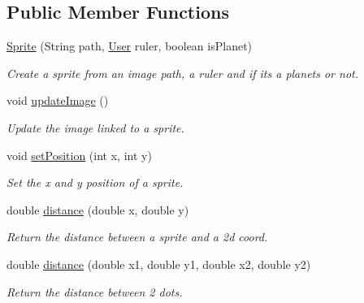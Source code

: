 \subsection*{Public Member Functions}
\begin{DoxyCompactItemize}
\item 
\hyperlink{classfr_1_1groupe40_1_1projet_1_1model_1_1_sprite_acbe678213b404fd8ae1a77fe274fdca8}{Sprite} (String path, \hyperlink{classfr_1_1groupe40_1_1projet_1_1client_1_1_user}{User} ruler, boolean is\+Planet)
\begin{DoxyCompactList}\small\item\em Create a sprite from an image path, a ruler and if its a planets or not. \end{DoxyCompactList}\item 
\mbox{\label{classfr_1_1groupe40_1_1projet_1_1model_1_1_sprite_a762bbcf4f03eecab8de2b05aa19a103a}} 
void \hyperlink{classfr_1_1groupe40_1_1projet_1_1model_1_1_sprite_a762bbcf4f03eecab8de2b05aa19a103a}{update\+Image} ()
\begin{DoxyCompactList}\small\item\em Update the image linked to a sprite. \end{DoxyCompactList}\item 
void \hyperlink{classfr_1_1groupe40_1_1projet_1_1model_1_1_sprite_ab3b2649df13b98ba229c292328e31b25}{set\+Position} (int x, int y)
\begin{DoxyCompactList}\small\item\em Set the x and y position of a sprite. \end{DoxyCompactList}\item 
double \hyperlink{classfr_1_1groupe40_1_1projet_1_1model_1_1_sprite_a4907c1229ac5b6a614e880649240ea7b}{distance} (double x, double y)
\begin{DoxyCompactList}\small\item\em Return the distance between a sprite and a 2d coord. \end{DoxyCompactList}\item 
double \hyperlink{classfr_1_1groupe40_1_1projet_1_1model_1_1_sprite_aa74fb93449c20a79f16edca9a7ae9482}{distance} (double x1, double y1, double x2, double y2)
\begin{DoxyCompactList}\small\item\em Return the distance between 2 dots. \end{DoxyCompactList}\item 

\end{DoxyCompactItemize}
